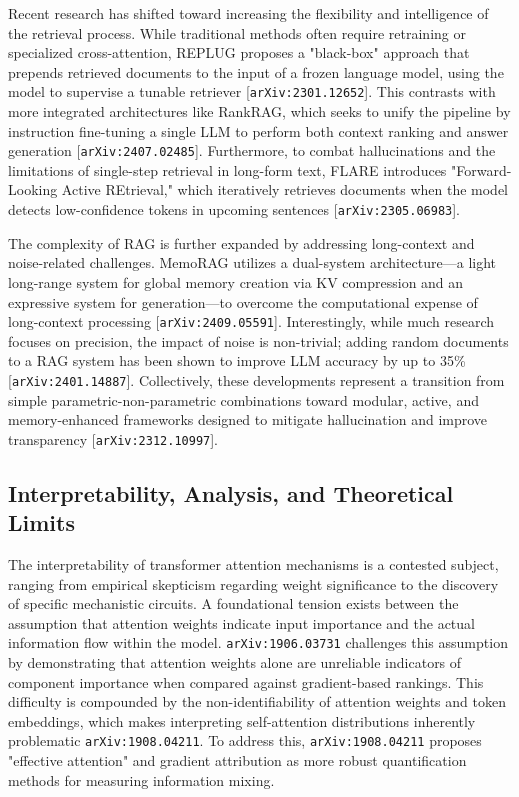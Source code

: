 \documentclass[11pt]{article}
\begin{document}
Recent research has shifted toward increasing the flexibility and intelligence of the retrieval process. While traditional methods often require retraining or specialized cross-attention, REPLUG proposes a "black-box" approach that prepends retrieved documents to the input of a frozen language model, using the model to supervise a tunable retriever [\texttt{arXiv:2301.12652}]. This contrasts with more integrated architectures like RankRAG, which seeks to unify the pipeline by instruction fine-tuning a single LLM to perform both context ranking and answer generation [\texttt{arXiv:2407.02485}]. Furthermore, to combat hallucinations and the limitations of single-step retrieval in long-form text, FLARE introduces "Forward-Looking Active REtrieval," which iteratively retrieves documents when the model detects low-confidence tokens in upcoming sentences [\texttt{arXiv:2305.06983}].

The complexity of RAG is further expanded by addressing long-context and noise-related challenges. MemoRAG utilizes a dual-system architecture—a light long-range system for global memory creation via KV compression and an expressive system for generation—to overcome the computational expense of long-context processing [\texttt{arXiv:2409.05591}]. Interestingly, while much research focuses on precision, the impact of noise is non-trivial; adding random documents to a RAG system has been shown to improve LLM accuracy by up to 35\% [\texttt{arXiv:2401.14887}]. Collectively, these developments represent a transition from simple parametric-non-parametric combinations toward modular, active, and memory-enhanced frameworks designed to mitigate hallucination and improve transparency [\texttt{arXiv:2312.10997}].

\subsection{Interpretability, Analysis, and Theoretical Limits}

The interpretability of transformer attention mechanisms is a contested subject, ranging from empirical skepticism regarding weight significance to the discovery of specific mechanistic circuits. A foundational tension exists between the assumption that attention weights indicate input importance and the actual information flow within the model. \texttt{arXiv:1906.03731} challenges this assumption by demonstrating that attention weights alone are unreliable indicators of component importance when compared against gradient-based rankings. This difficulty is compounded by the non-identifiability of attention weights and token embeddings, which makes interpreting self-attention distributions inherently problematic \texttt{arXiv:1908.04211}. To address this, \texttt{arXiv:1908.04211} proposes "effective attention" and gradient attribution as more robust quantification methods for measuring information mixing.
\end{document}
